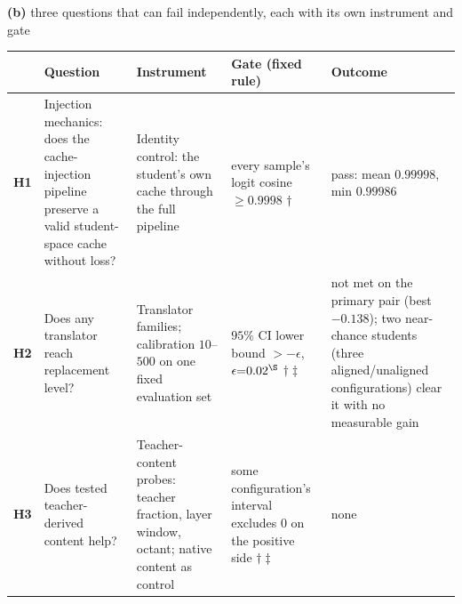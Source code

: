 \vspace{1.6mm}
{\footnotesize\textbf{(b)} three questions that can fail independently,
each with its own instrument and gate\par}
\vspace{1.2mm}
{\footnotesize
\setlength{\tabcolsep}{3pt}%
\begin{tabular}{@{}p{0.62cm}p{2.85cm}p{3.55cm}p{3.05cm}p{2.45cm}@{}}
\toprule
 & \textbf{Question} & \textbf{Instrument} & \textbf{Gate (fixed rule)} & \textbf{Outcome} \\
\midrule
\textbf{H1} & Injection mechanics: does the cache-injection pipeline preserve a
valid student-space cache without loss?
 & Identity control: the student's own cache through the full pipeline
 & every sample's logit cosine $\ge 0.9998$ $\dagger$
 & pass: mean $0.99998$, min $0.99986$ \\
\addlinespace[1pt]
\textbf{H2} & Does any translator reach replacement level?
 & Translator families; calibration $10$--$500$ on one fixed evaluation set
 & $95\%$ CI lower bound $>-\epsilon$, $\epsilon{=}0.02^{\S}$ $\dagger\ddagger$
 & not met on the primary pair (best $-0.138$); two near-chance students
 (three aligned/unaligned configurations) clear it with no measurable gain \\
\addlinespace[1pt]
\textbf{H3} & Does tested teacher-derived content help?
 & Teacher-content probes: teacher fraction, layer window, octant; native content as control
 & some configuration's interval excludes $0$ on the positive side $\dagger\ddagger$
 & none \\
\bottomrule
\end{tabular}}
